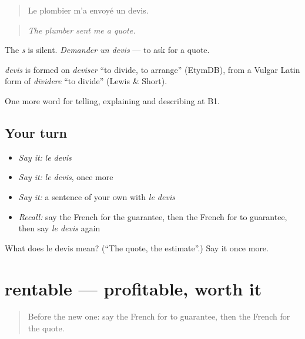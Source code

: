 \begin{quote}
Le plombier m'a envoyé un devis.
\end{quote}

\begin{quote}
\emph{The plumber sent me a quote.}
\end{quote}

The \emph{s} is silent. \emph{Demander un devis} — to ask for a quote.

\begin{cousinweb}
\emph{devis} is formed on \emph{deviser} \textquotedblleft{}to divide, to arrange\textquotedblright{} (EtymDB), from a Vulgar Latin form of \emph{dīvidere} \textquotedblleft{}to divide\textquotedblright{} (Lewis \& Short).
\end{cousinweb}

\begin{grammarlens}[title={What you've built}]
One more word for telling, explaining and describing at B1.
\end{grammarlens}

\subsection*{Your turn}
\begin{itemize}
\raggedright
  \item \emph{Say it:} \emph{le devis}
  \item \emph{Say it:} \emph{le devis}, once more
  \item \emph{Say it:} a sentence of your own with \emph{le devis}
  \item \emph{Recall:} say the French for the guarantee, then the French for to guarantee, then say \emph{le devis} again
\end{itemize}

\begin{tcolorbox}[breakable,colback=teal!4,colframe=teal!35!black,title={Before you move on}]
What does le devis mean? (\textquotedblleft{}The quote, the estimate\textquotedblright{}.) Say it once more.
\end{tcolorbox}
\section[rentable]{rentable — profitable, worth it}

\label{lesson:FR-C393-rentable}



\begin{quote}
Before the new one: say the French for to guarantee, then the French for the quote.
\end{quote}

